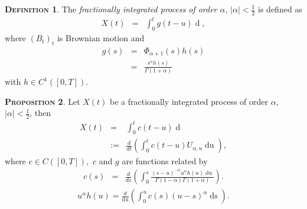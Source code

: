 \documentclass[a4paper, twoside, 11pt]{article}
\theoremstyle{definition}
\newtheorem{definition}{\scshape Definition}[section]
\newtheorem{proposition}[definition]{\scshape Proposition}
\newcommand{\brkt}[1]{\left({#1} \right)}
\begin{document}
  \begin{definition}
	The \emph{fractionally integrated process of order $\alpha$}, $|\alpha| < \frac{1}{2}$ is defined as
	\begin{eqnarray}
	  X(t) &=&  \int_0^{t} g(t - u) \mathop{dB_u},
	  \label{sec:frac}
	\end{eqnarray}
	where $(B_t)_t$ is Brownian motion and 
	\begin{eqnarray}
	  g(s) &=& \Phi_{\alpha+1}(s)h(s)\\
	  &=& \frac{s^\alpha h(s)}{\Gamma(1+\alpha)}
	  \label{sec:wer}
	\end{eqnarray}
	with $h \in C^1([0, T])$.
  \end{definition}
  \begin{proposition}
	Let $X(t)$ be a fractionally integrated process of order $\alpha$, $|\alpha| < \frac{1}{2}$, then
	\begin{eqnarray}
	  X(t) &=& \int_0^t c(t-u)\mathop{dU_{\alpha, u}}\\
	  &:=& \frac{d}{dt}\brkt{\int_0^t c(t-u) U_{\alpha, u} \mathop{du}},
	  \label{sec:bb1}
	\end{eqnarray}
	where $c \in C([0, T]),$ $c$ and $g$ are functions related by
	\begin{eqnarray}
	  c(s) &=& \frac{d}{ds}\brkt{\int_0^s \frac{(s-u)^{-\alpha}u^\alpha h(u) \mathop{du}}{\Gamma(1-\alpha)\Gamma(1+\alpha)}}.
  \label{sec:frac2}
	\end{eqnarray}
	\begin{eqnarray}
	  u^\alpha h(u) = \frac{d}{\mathop{du}}\brkt{\int_0^u c(s) (u-s)^\alpha \mathop{ds}}.
	  \label{sec:frac3}
	\end{eqnarray}
  \end{proposition}
\end{document}

